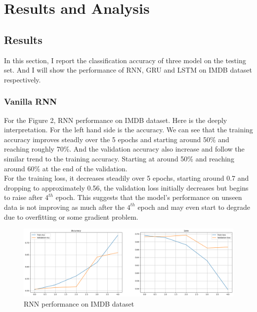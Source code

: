 \documentclass[12pt,a4paper]{article}
\begin{document}
\section{Results and Analysis}
\subsection{Results}
In this section, I report the classification accuracy of three model on the testing set. And I will show the performance of RNN, GRU and LSTM on IMDB dataset respectively. 
\subsubsection{Vanilla RNN}
For the Figure 2, RNN performance on IMDB dataset. Here is the deeply interpretation. For the left hand side is the accuracy. We can see that the training accuracy improves steadly over the 5 epochs and starting around 50\% and reaching roughly 70\%. And the validation accuracy also increase and follow the similar trend to the training accuracy. Starting at around 50\% and reaching around 60\% at the end of the validation. 
\\[1ex]
For the training loss, it decreases steadily over 5 epochs, starting around 0.7 and dropping to approximately 0.56, the validation loss initially decreases but begins to raise after $4^{th}$ epoch. This suggests that the model's performance on unseen data is not improving as much after the $4^{th}$ epoch and may even start to degrade due to overfitting or some gradient problem.
\begin{figure}[h!]
    \centering
    \includegraphics[width=1\textwidth]{../Pic/rnn_performance.png} 
    \caption{RNN performance on IMDB dataset}
\end{figure}
\end{document}
